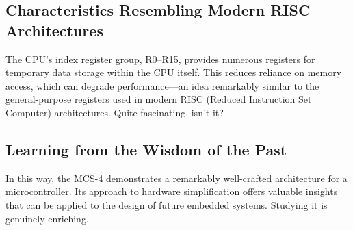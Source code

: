 \subsection{Characteristics Resembling Modern RISC Architectures}
The CPU’s index register group, R0–R15, provides numerous registers for temporary data storage within the CPU itself. This reduces reliance on memory access, which can degrade performance—an idea remarkably similar to the general-purpose registers used in modern RISC (Reduced Instruction Set Computer) architectures. Quite fascinating, isn’t it?

\subsection{Learning from the Wisdom of the Past}
In this way, the MCS-4 demonstrates a remarkably well-crafted architecture for a microcontroller. Its approach to hardware simplification offers valuable insights that can be applied to the design of future embedded systems. Studying it is genuinely enriching.

